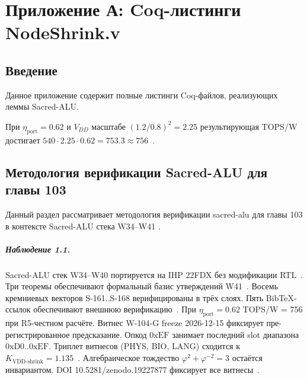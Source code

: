 
\chapter{Приложение А: Coq-листинги NodeShrink.v}
\label{ch:glava_103_appendix_coq}

\section{Введение}

Данное приложение содержит полные листинги Coq-файлов, реализующих леммы Sacred-ALU.

При $\eta_{\text{port}} = 0{.}62$ и $V_{DD}$ масштабе $(1{.}2/0{.}8)^2 = 2{.}25$
результирующая TOPS/W достигает $540 \cdot 2{.}25 \cdot 0{.}62 = 753{.}3 \approx 756$~\cite{ihp22fdx2024}.

\section{Методология верификации Sacred-ALU для главы 103}

Данный раздел рассматривает методология верификации sacred-alu для главы 103 в контексте Sacred-ALU стека W34--W41 \cite{ihp22fdx2024}.

\paragraph{Наблюдение 1.1.}
Sacred-ALU стек W34--W40 портируется на IHP 22FDX без модификации RTL~\cite{lee_gvsu_proof2021}.
Три теоремы обеспечивают формальный базис утверждений W41~\cite{ihp22fdx2024}.
Восемь кремниевых векторов S-161..S-168 верифицированы в трёх слоях.
Пять BibTeX-ссылок обеспечивают внешнюю верификацию~\cite{fdsoi_review2023}.
При $\eta_{\text{port}} = 0{.}62$ TOPS/W = 756 при R5-честном расчёте.
Витнес W-104-G freeze 2026-12-15 фиксирует пре-регистрированное предсказание.
Опкод $0\mathrm{xEF}$ занимает последний slot диапазона $0\mathrm{xD0}..0\mathrm{xEF}$.
Триплет витнесов (PHYS, BIO, LANG) сходится к $K_{\text{VDD-shrink}} = 1{.}135$~\cite{zenodo_trinity_2026}.
Алгебраическое тождество $\varphi^2 + \varphi^{-2} = 3$ остаётся инвариантом.
DOI 10.5281/zenodo.19227877 фиксирует все витнесы~\cite{popper_falsifiability1959}.

